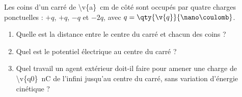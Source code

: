 Les coins d'un carré de \qty{\v{a}}{cm} de côté sont occupés par quatre charges ponctuelles : $+q$, $+q$, $-q$ et $-2q$, avec $q = \qty{\v{q}}{\nano\coulomb}$.

\begin{enumerate}[label=\alph*)]
    \item Quelle est la distance entre le centre du carré et chacun des coins ?
    \item Quel est le potentiel électrique au centre du carré ?
    \item Quel travail un agent extérieur doit-il faire pour amener une charge de \qty{\v{q0}}{\nano\coulomb} de l'infini jusqu'au centre du carré, sans variation d'énergie cinétique ?
\end{enumerate}
